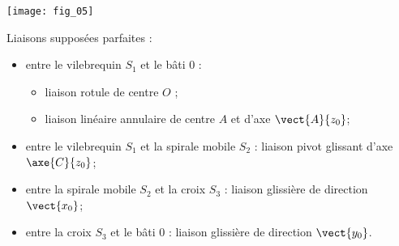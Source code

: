 \begin{center}%
\texttt{[image: fig\_05]}
\end{center}




Liaisons supposées parfaites :
\begin{itemize} 
\item entre le vilebrequin $S_1$ et le bâti 0 :
\begin{itemize}
\item liaison rotule de centre $O$ ;
\item liaison linéaire annulaire de centre $A$ et d’axe $\vect{A}{z_0}$;
\end{itemize}
\item entre le vilebrequin $S_1$ et la spirale mobile $S_2$  :
liaison pivot glissant d’axe $\axe{C}{z_0}$;
\item entre la spirale mobile $S_2$  et la croix $S_3$  :
liaison glissière de direction $\vect{x_0}$;
\item entre la croix $S_3$ et le bâti 0 :
liaison glissière de direction $\vect{y_0}$.
\end{itemize}

